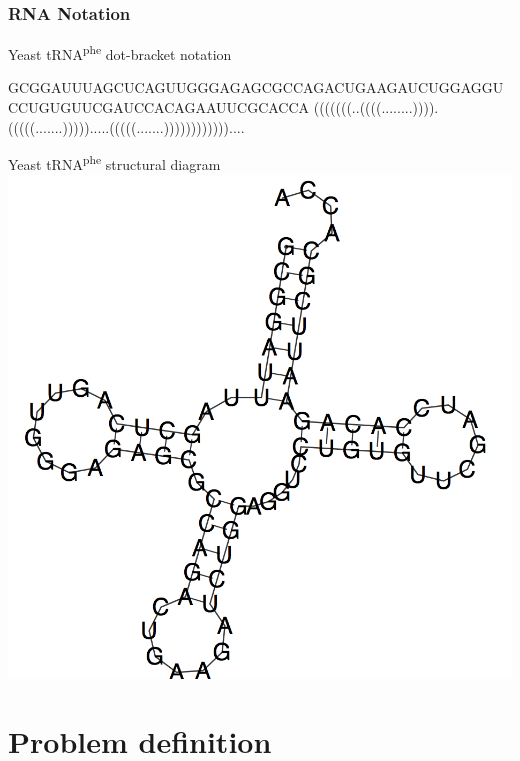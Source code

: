 \documentclass{beamer}
\begin{document}
\begin{frame}[fragile]
  \frametitle{RNA Notation}
  \begin{block}{Yeast tRNA\textsuperscript{phe} dot-bracket notation}
  \scriptsize\begin{semiverbatim}
  GCGGAUUUAGCUCAGUUGGGAGAGCGCCAGACUGAAGAUCUGGAGGUCCUGUGUUCGAUCCACAGAAUUCGCACCA
  (((((((..((((........)))).(((((.......))))).....(((((.......))))))))))))....
  \end{semiverbatim}
  \end{block}

  \begin{block}{Yeast tRNA\textsuperscript{phe} structural diagram}
  \vspace{1ex}
  \centering\includegraphics[scale=.25]{rna.png}
  \end{block}
\end{frame}

\section{Problem definition}
\end{document}
